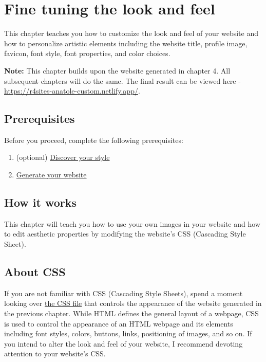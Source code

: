 \documentclass[
]{book}
\providecommand{\tightlist}{%
  \setlength{\itemsep}{0pt}\setlength{\parskip}{0pt}}
\begin{document}
\hypertarget{fine-tune}{%
\chapter{Fine tuning the look and feel}\label{fine-tune}}

This chapter teaches you how to customize the look and feel of your website and how to personalize artistic elements including the website title, profile image, favicon, font style, font properties, and color choices.

\textbf{Note:} This chapter builds upon the website generated in chapter 4. All subsequent chapters will do the same. The final result can be viewed here - \url{https://r4sites-anatole-custom.netlify.app/}.

\hypertarget{prerequisites-1}{%
\section{Prerequisites}\label{prerequisites-1}}

Before you proceed, complete the following prerequisites:

\begin{enumerate}
\def\labelenumi{\arabic{enumi}.}
\tightlist
\item
  (optional) \protect\hyperlink{choose-theme}{Discover your style}
\item
  \protect\hyperlink{generate}{Generate your website}
\end{enumerate}

\hypertarget{how-it-works-2}{%
\section{How it works}\label{how-it-works-2}}

This chapter will teach you how to use your own images in your website and how to edit aesthetic properties by modifying the website's CSS (Cascading Style Sheet).

\hypertarget{about-css}{%
\section{About CSS}\label{about-css}}

If you are not familiar with CSS (Cascading Style Sheets), spend a moment looking over \href{https://github.com/dannymorris/r4sites-anatole-custom/blob/master/themes/anatole/assets/css/style.css}{the CSS file} that controls the appearance of the website generated in the previous chapter. While HTML defines the general layout of a webpage, CSS is used to control the appearance of an HTML webpage and its elements including font styles, colors, buttons, links, positioning of images, and so on. If you intend to alter the look and feel of your website, I recommend devoting attention to your website's CSS.
\end{document}
